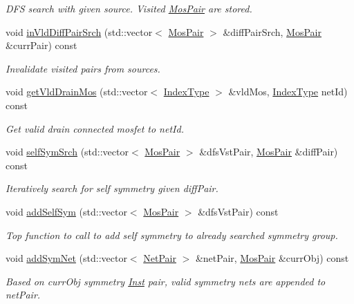 \begin{DoxyCompactItemize}
\begin{DoxyCompactList}\small\item\em D\+FS search with given source. Visited \hyperlink{classMosPair}{Mos\+Pair} are stored. \end{DoxyCompactList}\item 
void \hyperlink{classSymDetect_ae6a1ba27f6768f215cba0623b6e2ce08}{in\+Vld\+Diff\+Pair\+Srch} (std\+::vector$<$ \hyperlink{classMosPair}{Mos\+Pair} $>$ \&diff\+Pair\+Srch, \hyperlink{classMosPair}{Mos\+Pair} \&curr\+Pair) const
\begin{DoxyCompactList}\small\item\em Invalidate visited pairs from sources. \end{DoxyCompactList}\item 
void \hyperlink{classSymDetect_a48c23173bf5e56c3aa11ac306715cba2}{get\+Vld\+Drain\+Mos} (std\+::vector$<$ \hyperlink{type_8h_a581e8093e28e7362f2b6937296190676}{Index\+Type} $>$ \&vld\+Mos, \hyperlink{type_8h_a581e8093e28e7362f2b6937296190676}{Index\+Type} net\+Id) const
\begin{DoxyCompactList}\small\item\em Get valid drain connected mosfet to net\+Id. \end{DoxyCompactList}\item 
void \hyperlink{classSymDetect_ab6f286024b013fa257295111016da18b}{self\+Sym\+Srch} (std\+::vector$<$ \hyperlink{classMosPair}{Mos\+Pair} $>$ \&dfs\+Vst\+Pair, \hyperlink{classMosPair}{Mos\+Pair} \&diff\+Pair) const
\begin{DoxyCompactList}\small\item\em Iteratively search for self symmetry given diff\+Pair. \end{DoxyCompactList}\item 
void \hyperlink{classSymDetect_ac3075fde17fa6c33093a683b18f17086}{add\+Self\+Sym} (std\+::vector$<$ \hyperlink{classMosPair}{Mos\+Pair} $>$ \&dfs\+Vst\+Pair) const
\begin{DoxyCompactList}\small\item\em Top function to call to add self symmetry to already searched symmetry group. \end{DoxyCompactList}\item 
void \hyperlink{classSymDetect_a3d47390c92f0bd31d1ab84f1a62d66e3}{add\+Sym\+Net} (std\+::vector$<$ \hyperlink{classNetPair}{Net\+Pair} $>$ \&net\+Pair, \hyperlink{classMosPair}{Mos\+Pair} \&curr\+Obj) const
\begin{DoxyCompactList}\small\item\em Based on curr\+Obj symmetry \hyperlink{classInst}{Inst} pair, valid symmetry nets are appended to net\+Pair. \end{DoxyCompactList}\item 

\end{DoxyCompactItemize}
